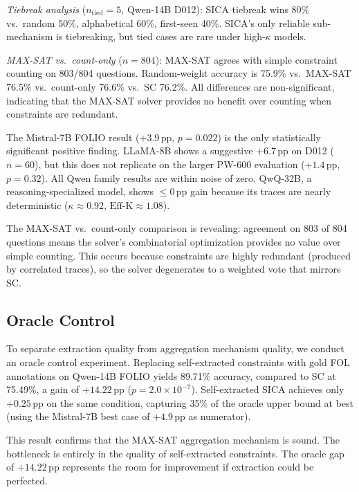 \documentclass[11pt,a4paper]{article}
\newcommand{\effk}{\text{Eff-K}}
\begin{document}
\begin{table}[t]
{\footnotesize \textit{Tiebreak analysis} ($n_{\text{tied}}=5$, Qwen-14B D012): SICA tiebreak wins 80\% vs.\ random 50\%, alphabetical 60\%, first-seen 40\%. SICA's only reliable sub-mechanism is tiebreaking, but tied cases are rare under high-$\kappa$ models.}

\vspace{0.3em}
{\footnotesize \textit{MAX-SAT vs.\ count-only} ($n=804$): MAX-SAT agrees with simple constraint counting on 803/804 questions. Random-weight accuracy is 75.9\% vs.\ MAX-SAT 76.5\% vs.\ count-only 76.6\% vs.\ SC 76.2\%. All differences are non-significant, indicating that the MAX-SAT solver provides no benefit over counting when constraints are redundant.}
\end{table}

The Mistral-7B FOLIO result ($+3.9$\,pp, $p=0.022$) is the only statistically significant positive finding. LLaMA-8B shows a suggestive $+6.7$\,pp on D012 ($n=60$), but this does not replicate on the larger PW-600 evaluation ($+1.4$\,pp, $p=0.32$). All Qwen family results are within noise of zero. QwQ-32B, a reasoning-specialized model, shows $\leq 0$\,pp gain because its traces are nearly deterministic ($\kappa \approx 0.92$, $\effk \approx 1.08$).

The MAX-SAT vs.\ count-only comparison is revealing: agreement on 803 of 804 questions means the solver's combinatorial optimization provides no value over simple counting. This occurs because constraints are highly redundant (produced by correlated traces), so the solver degenerates to a weighted vote that mirrors SC.

\subsection{Oracle Control}
\label{sec:oracle}

To separate extraction quality from aggregation mechanism quality, we conduct an oracle control experiment. Replacing self-extracted constraints with gold FOL annotations on Qwen-14B FOLIO yields 89.71\% accuracy, compared to SC at 75.49\%, a gain of $+14.22$\,pp ($p = 2.0 \times 10^{-7}$). Self-extracted SICA achieves only $+0.25$\,pp on the same condition, capturing 35\% of the oracle upper bound at best (using the Mistral-7B best case of $+4.9$\,pp as numerator).

This result confirms that the MAX-SAT aggregation mechanism is sound. The bottleneck is entirely in the quality of self-extracted constraints. The oracle gap of $+14.22$\,pp represents the room for improvement if extraction could be perfected.
\end{document}

